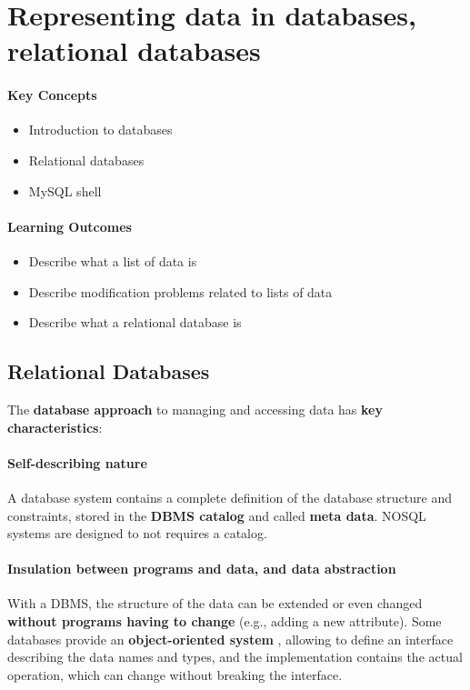 \section{Representing data in databases, relational databases}

\begin{mdframed}

\paragraph{Key Concepts}
\begin{itemize}[label={\checkmark}]
\item Introduction to databases
\item Relational databases
\item MySQL shell
\end{itemize}

\paragraph{Learning Outcomes}
\begin{itemize}[label={\checkmark}]
\item Describe what a list of data is
\item Describe modification problems related to lists of data
\item Describe what a relational database is 
\end{itemize}
\end{mdframed}

\subsection{Relational Databases}
The \textbf{database approach} to managing and accessing data has \textbf{key characteristics}:

\paragraph{Self-describing nature} A database system contains a complete definition of the database structure and constraints, stored in the \textbf{DBMS catalog} and called \textbf{meta data}. NOSQL systems are designed to not requires a catalog.

\paragraph{Insulation between programs and data, and data abstraction} With a DBMS, the structure of the data can be extended or even changed \textbf{without programs having to change}  (e.g., adding a new attribute). Some databases provide an \textbf{object-oriented system} , allowing to define an interface describing the data names and types, and the implementation contains the actual operation, which can change without breaking the interface.

